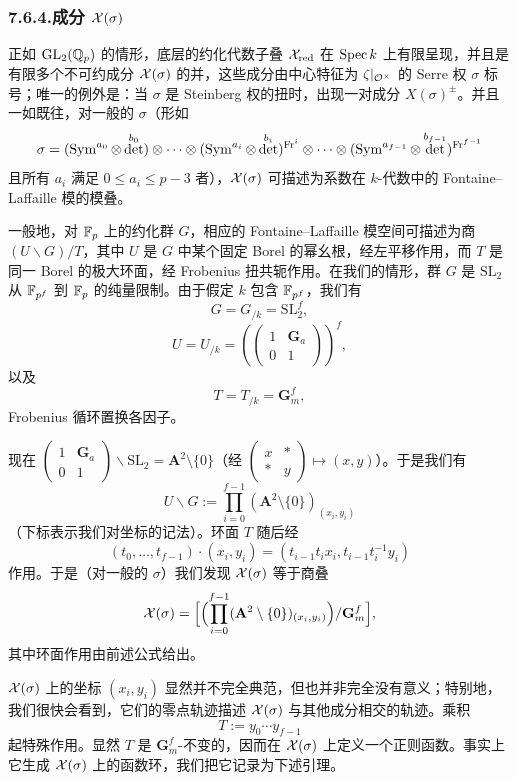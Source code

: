 \subsubsection*{7.6.4.\quad 成分 $\mathcal{X}(\sigma)$}
正如 $\mathrm{GL}_2(\mathbb{Q}_p)$ 的情形，底层的约化代数子叠 $\mathcal{X}_{\mathrm{red}}$ 在 $\operatorname{Spec} k$ 上有限呈现，并且是有限多个不可约成分 $\mathcal{X}(\sigma)$ 的并，这些成分由中心特征为 $\zeta|_{\mathcal{O}^\times}$ 的 Serre 权 $\sigma$ 标号；唯一的例外是：当 $\sigma$ 是 Steinberg 权的扭时，出现一对成分 $X(\sigma)^{\pm}$。并且一如既往，对一般的 $\sigma$（形如
\[
\sigma=(\operatorname{Sym}^{a_0}\otimes\det^{b_0})\otimes\cdots\otimes(\operatorname{Sym}^{a_i}\otimes\det^{b_i})^{\mathrm{Fr}^{i}}\otimes\cdots\otimes(\operatorname{Sym}^{a_{f-1}}\otimes\det^{b_{f-1}})^{\mathrm{Fr}^{f-1}}
\]
且所有 $a_i$ 满足 $0\le a_i\le p-3$ 者），$\mathcal{X}(\sigma)$ 可描述为系数在 $k$-代数中的 Fontaine--Laffaille 模的模叠。

一般地，对 $\mathbb{F}_p$ 上的约化群 $G$，相应的 Fontaine--Laffaille 模空间可描述为商 $(U\backslash G)/T$，其中 $U$ 是 $G$ 中某个固定 Borel 的幂幺根，经左平移作用，而 $T$ 是同一 Borel 的极大环面，经 Frobenius 扭共轭作用。在我们的情形，群 $G$ 是 $\mathrm{SL}_2$ 从 $\mathbb{F}_{p^f}$ 到 $\mathbb{F}_p$ 的纯量限制。由于假定 $k$ 包含 $\mathbb{F}_{p^f}$，我们有
\[
G=G_{/k}=\mathrm{SL}_2^{f},
\]
\[
U=U_{/k}=\left(\begin{pmatrix}1&\mathbf G_a\\0&1\end{pmatrix}\right)^{f},
\]
以及
\[
T=T_{/k}=\mathbf G_m^{f},
\]
Frobenius 循环置换各因子。

现在 $\begin{pmatrix}1&\mathbf G_a\\0&1\end{pmatrix}\backslash\mathrm{SL}_2=\mathbf A^{2}\setminus\{0\}$（经 $\begin{pmatrix}x&*\\*&y\end{pmatrix}\mapsto(x,y)$）。于是我们有
\[
U\backslash G:=\prod_{i=0}^{f-1}(\mathbf A^{2}\setminus\{0\})_{(x_i,y_i)}
\]
（下标表示我们对坐标的记法）。环面 $T$ 随后经
\[
(t_0,\dots,t_{f-1})\cdot(x_i,y_i)=(t_{i-1}t_ix_i,t_{i-1}t_i^{-1}y_i)
\]
作用。于是（对一般的 $\sigma$）我们发现 $\mathcal{X}(\sigma)$ 等于商叠
\[
\mathcal{X}(\sigma)=\Bigl[\Bigl(\prod_{i=0}^{f-1}(\mathbf A^{2}\setminus\{0\})_{(x_i,y_i)}\Bigr)/\mathbf G_m^{f}\Bigr],
\]
其中环面作用由前述公式给出。

$\mathcal{X}(\sigma)$ 上的坐标 $(x_i,y_i)$ 显然并不完全典范，但也并非完全没有意义；特别地，我们很快会看到，它们的零点轨迹描述 $\mathcal{X}(\sigma)$ 与其他成分相交的轨迹。乘积
\[
T:=y_0\cdots y_{f-1}
\]
起特殊作用。显然 $T$ 是 $\mathbf G_m^{f}$-不变的，因而在 $\mathcal{X}(\sigma)$ 上定义一个正则函数。事实上它生成 $\mathcal{X}(\sigma)$ 上的函数环，我们把它记录为下述引理。

